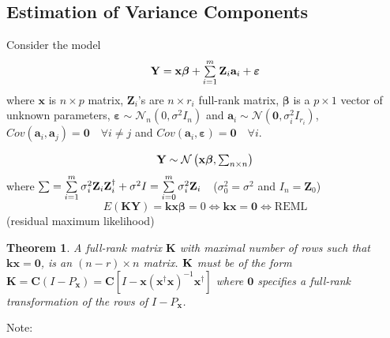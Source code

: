 \documentclass{article}
\newtheorem{theorem}{Theorem}
\begin{document}
\bigskip

\subsection{Estimation of Variance Components}

Consider the model%
\begin{equation*}
\mathbf{Y}=\mathbf{x\beta }+\tsum\limits_{i=1}^{m}\mathbf{Z}_{i}\mathbf{a}%
_{i}+\mathbf{\varepsilon }
\end{equation*}%
where $\mathbf{x}$ is $n\times p$ matrix, $\mathbf{Z}_{i}$'s are $n\times
r_{i}$ full-rank matrix, $\mathbf{\beta }$ is a $p\times 1$ vector of
unknown parameters, $\mathbf{\varepsilon \sim }\mathcal{N}_{n}\left(
0,\sigma ^{2}I_{n}\right) $ and $\mathbf{a}_{i}\sim \mathcal{N}\left( 
\mathbf{0},\sigma _{i}^{2}I_{r_{i}}\right) $, $Cov\left( \mathbf{a}_{i},%
\mathbf{a}_{j}\right) =\mathbf{0}\quad \forall i\neq j$ and $Cov\left( 
\mathbf{a}_{i},\mathbf{\varepsilon }\right) =\mathbf{0}\quad \forall i$.

\bigskip

\begin{equation*}
\therefore \mathbf{Y}\sim \mathcal{N}\left( \mathbf{x\beta }%
,\tsum\nolimits_{n\times n}\right) 
\end{equation*}%
where $\tsum =\tsum\limits_{i=1}^{m}\sigma _{i}^{2}\mathbf{Z}_{i}\mathbf{Z}%
_{i}^{\dagger }+\sigma ^{2}I=\tsum\limits_{i=0}^{m}\sigma _{i}^{2}\mathbf{Z}%
_{i}\quad $($\sigma _{0}^{2}=\sigma ^{2}$ and $I_{n}=\mathbf{Z}_{0}$)%
\begin{equation*}
E\left( \mathbf{KY}\right) =\mathbf{kx\beta }=0\Leftrightarrow \mathbf{kx}=%
\mathbf{0}\Leftrightarrow \text{REML}
\end{equation*}%
(residual maximum likelihood)

\bigskip

\begin{theorem}
A full-rank matrix $\mathbf{K}$ with maximal number of rows such that $%
\mathbf{kx}=\mathbf{0}$, is an $\left( n-r\right) \times n$ matrix. $\mathbf{%
K}$ must be of the form $\mathbf{K}=\mathbf{C}\left( I-P_{\mathbf{x}}\right)
=\mathbf{C}\left[ I-\mathbf{x}\left( \mathbf{x}^{\dagger }\mathbf{x}\right)
^{-1}\mathbf{x}^{\dagger }\right] $ where $\mathbf{0}$ specifies a full-rank
transformation of the rows of $I-P_{\mathbf{x}}$.
\end{theorem}

\bigskip

Note:
\end{document}
